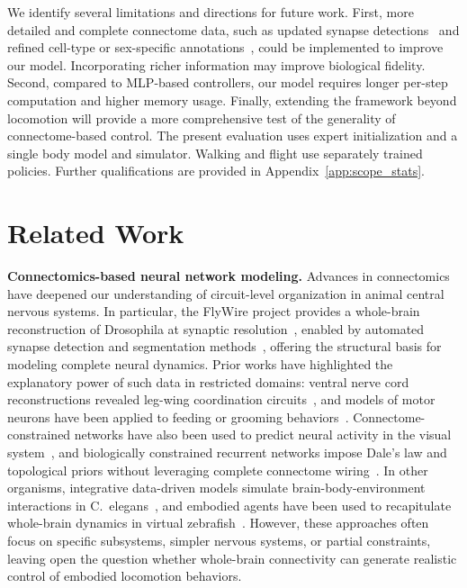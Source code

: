 \documentclass[a4paper]{easychair}
\begin{document}
We identify several limitations and directions for future work. First, more detailed and complete connectome data, such as updated synapse detections~\citep{Yu2025} and refined cell-type or sex-specific annotations~\citep{Matsliah2023,Deutsch2025}, could be implemented to improve our model. Incorporating richer information may improve biological fidelity. Second, compared to MLP-based controllers, our model requires longer per-step computation and higher memory usage. Finally, extending the framework beyond locomotion will provide a more comprehensive test of the generality of connectome-based control. The present evaluation uses expert initialization and a single body model and simulator. Walking and flight use separately trained policies. Further qualifications are provided in Appendix~\ref{app:scope_stats}.



\newpage



\newpage
\appendix

\section{Related Work}
\label{app:related}

\textbf{Connectomics-based neural network modeling.} Advances in connectomics have deepened our understanding of circuit-level organization in animal central nervous systems. In particular, the FlyWire project provides a whole-brain reconstruction of Drosophila at synaptic resolution~\citep{Dorkenwald2024a,Schlegel2024a,Lin2024a,Zheng2018a}, enabled by automated synapse detection and segmentation methods~\citep{Buhmann2021,Heinrich2018a}, offering the structural basis for modeling complete neural dynamics. Prior works have highlighted the explanatory power of such data in restricted domains: ventral nerve cord reconstructions revealed leg-wing coordination circuits~\citep{Azevedo2024,Lesser2024}, and models of motor neurons have been applied to feeding or grooming behaviors~\citep{Shiu2024}. Connectome-constrained networks have also been used to predict neural activity in the visual system~\citep{Lappalainen2024,Matsliah2024a}, and biologically constrained recurrent networks impose Dale's law and topological priors without leveraging complete connectome wiring~\citep{Balwani2025}. In other organisms, integrative data-driven models simulate brain-body-environment interactions in C.~elegans~\citep{Zhao2024}, and embodied agents have been used to recapitulate whole-brain dynamics in virtual zebrafish~\citep{keller2025}. However, these approaches often focus on specific subsystems, simpler nervous systems, or partial constraints, leaving open the question whether whole-brain connectivity can generate realistic control of embodied locomotion behaviors.
\end{document}
